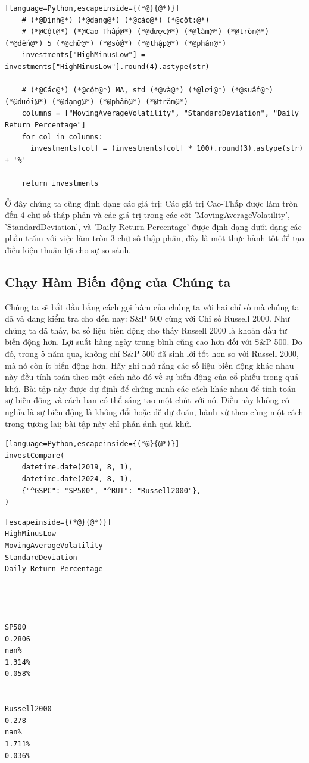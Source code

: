 \begin{lstlisting}[language=Python,escapeinside={(*@}{@*)}]
    # (*@Định@*) (*@dạng@*) (*@các@*) (*@cột:@*)
    # (*@Cột@*) (*@Cao-Thấp@*) (*@được@*) (*@làm@*) (*@tròn@*) (*@đến@*) 5 (*@chữ@*) (*@số@*) (*@thập@*) (*@phân@*)
    investments["HighMinusLow"] = investments["HighMinusLow"].round(4).astype(str)

    # (*@Các@*) (*@cột@*) MA, std (*@và@*) (*@lợi@*) (*@suất@*) (*@dưới@*) (*@dạng@*) (*@phần@*) (*@trăm@*)
    columns = ["MovingAverageVolatility", "StandardDeviation", "Daily Return Percentage"]
    for col in columns:
      investments[col] = (investments[col] * 100).round(3).astype(str) + '%'

    return investments
\end{lstlisting}

Ở đây chúng ta cũng định dạng các giá trị: Các giá trị Cao-Thấp được làm tròn đến 4 chữ số thập phân và các giá trị trong các cột 'MovingAverageVolatility', 'StandardDeviation', và 'Daily Return Percentage' được định dạng dưới dạng các phần trăm với việc làm tròn 3 chữ số thập phân, đây là một thực hành tốt để tạo điều kiện thuận lợi cho sự so sánh.

\subsection{Chạy Hàm Biến động của Chúng ta}

Chúng ta sẽ bắt đầu bằng cách gọi hàm của chúng ta với hai chỉ số mà chúng ta đã và đang kiểm tra cho đến nay: S\&P 500 cùng với Chỉ số Russell 2000. Như chúng ta đã thấy, ba số liệu biến động cho thấy Russell 2000 là khoản đầu tư biến động hơn. Lợi suất hàng ngày trung bình cũng cao hơn đối với S\&P 500. Do đó, trong 5 năm qua, không chỉ S\&P 500 đã sinh lời tốt hơn so với Russell 2000, mà nó còn ít biến động hơn. Hãy ghi nhớ rằng các số liệu biến động khác nhau này đều tính toán theo một cách nào đó về sự biến động của cổ phiếu trong quá khứ. Bài tập này được dự định để chứng minh các cách khác nhau để tính toán sự biến động và cách bạn có thể sáng tạo một chút với nó. Điều này không có nghĩa là sự biến động là không đổi hoặc dễ dự đoán, hành xử theo cùng một cách trong tương lai; bài tập này chỉ phản ánh quá khứ.

\begin{lstlisting}[language=Python,escapeinside={(*@}{@*)}]
investCompare(
    datetime.date(2019, 8, 1),
    datetime.date(2024, 8, 1),
    {"^GSPC": "SP500", "^RUT": "Russell2000"},
)
\end{lstlisting}

\begin{lstlisting}[escapeinside={(*@}{@*)}]
HighMinusLow
MovingAverageVolatility
StandardDeviation
Daily Return Percentage




SP500
0.2806
nan%
1.314%
0.058%


Russell2000
0.278
nan%
1.711%
0.036%
\end{lstlisting}

